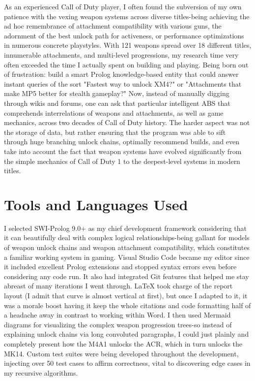 \documentclass[12pt,a4paper]{article}
\begin{document}
As an experienced Call of Duty player, I often found the subversion of my own
patience with the vexing weapon systems across diverse titles-being achieving
the ad hoc remembrance of attachment compatibility with various guns, the
adornment of the best unlock path for activeness, or performance optimizations
in numerous concrete playstyles. With 121 weapons spread over 18 different
titles, innumerable attachments, and multi-level progressions, my research time
very often exceeded the time I actually spent on building and playing. Being
born out of frustration: build a smart Prolog knowledge-based entity that could
answer instant queries of the sort "Fastest way to unlock XM4?" or "Attachments
that make MP5 better for stealth gameplay?" Now, instead of manually digging
through wikis and forums, one can ask that particular intelligent ABS that
comprehends interrelations of weapons and attachments, as well as game
mechanics, across two decades of Call of Duty history. The harder aspect was
not the storage of data, but rather ensuring that the program was able to sift
through huge branching unlock chains, optimally recommend builds, and even take
into account the fact that weapon systems have evolved significantly from the
simple mechanics of Call of Duty 1 to the deepest-level systems in modern
titles.

\section{Tools and Languages Used}

I selected SWI-Prolog 9.0+ as my chief development framework considering that
it can beautifully deal with complex logical relationships-being gallant for
models of weapon unlock chains and weapon attachment compatibility, which
constitutes a familiar working system in gaming. Visual Studio Code became my
editor since it included excellent Prolog extensions and stopped syntax errors
even before considering any code run. It also had integrated Git features that
helped me stay abreast of many iterations I went through. LaTeX took charge of
the report layout (I admit that curve is almost vertical at first), but once I
adapted to it, it was a morale boost having it keep the whole citations and
code formatting half of a headache away in contrast to working within Word. I
then used Mermaid diagrams for visualizing the complex weapon progression
trees-so instead of explaining unlock chains via long convoluted paragraphs, I
could just plainly and completely present how the M4A1 unlocks the ACR, which
in turn unlocks the MK14. Custom test suites were being developed throughout
the development, injecting over 50 test cases to affirm correctness, vital to
discovering edge cases in my recursive algorithms.
\end{document}
